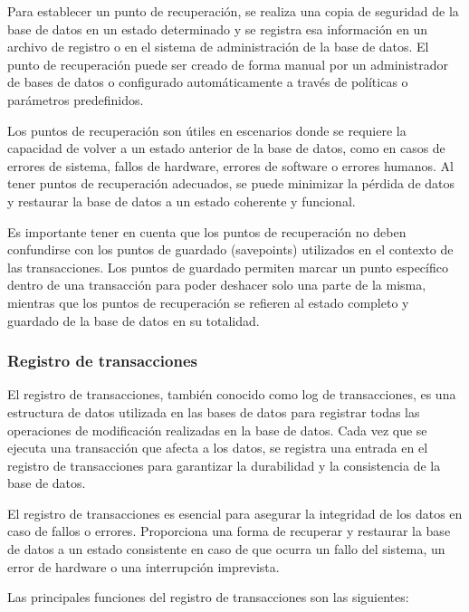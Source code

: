 Para establecer un punto de recuperación, se realiza una copia de seguridad de la base de datos en un estado determinado y se registra esa información en un archivo de registro o en el sistema de administración de la base de datos. El punto de recuperación puede ser creado de forma manual por un administrador de bases de datos o configurado automáticamente a través de políticas o parámetros predefinidos.

Los puntos de recuperación son útiles en escenarios donde se requiere la capacidad de volver a un estado anterior de la base de datos, como en casos de errores de sistema, fallos de hardware, errores de software o errores humanos. Al tener puntos de recuperación adecuados, se puede minimizar la pérdida de datos y restaurar la base de datos a un estado coherente y funcional.

Es importante tener en cuenta que los puntos de recuperación no deben confundirse con los puntos de guardado (savepoints) utilizados en el contexto de las transacciones. Los puntos de guardado permiten marcar un punto específico dentro de una transacción para poder deshacer solo una parte de la misma, mientras que los puntos de recuperación se refieren al estado completo y guardado de la base de datos en su totalidad.

\subsubsection{Registro de transacciones}
\noindent
El registro de transacciones, también conocido como log de transacciones, es una estructura de datos utilizada en las bases de datos para registrar todas las operaciones de modificación realizadas en la base de datos. Cada vez que se ejecuta una transacción que afecta a los datos, se registra una entrada en el registro de transacciones para garantizar la durabilidad y la consistencia de la base de datos.

El registro de transacciones es esencial para asegurar la integridad de los datos en caso de fallos o errores. Proporciona una forma de recuperar y restaurar la base de datos a un estado consistente en caso de que ocurra un fallo del sistema, un error de hardware o una interrupción imprevista.

Las principales funciones del registro de transacciones son las siguientes:

